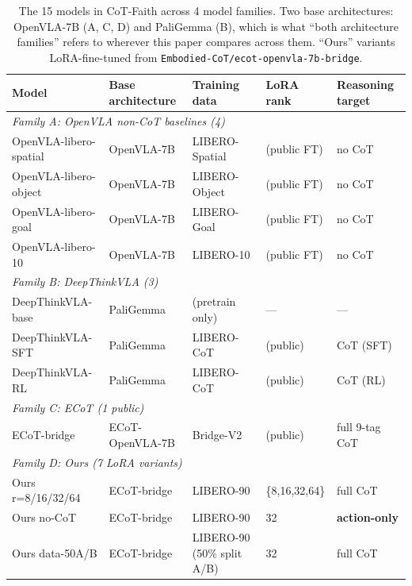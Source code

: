 \documentclass{article}
\begin{document}
\begin{table}[t]
\centering\small
\caption{The 15 models in CoT-Faith across 4 model families. Two base architectures: OpenVLA-7B (A, C, D) and PaliGemma (B), which is what ``both architecture families'' refers to wherever this paper compares across them. ``Ours'' variants LoRA-fine-tuned from \texttt{Embodied-CoT/ecot-openvla-7b-bridge}.}
\label{tab:models}
\begin{tabular}{l l l l l}
\toprule
Model & Base architecture & Training data & LoRA rank & Reasoning target \\
\midrule
\multicolumn{5}{l}{\textit{Family A: OpenVLA non-CoT baselines (4)}} \\
OpenVLA-libero-spatial & OpenVLA-7B     & LIBERO-Spatial & (public FT) & no CoT \\
OpenVLA-libero-object  & OpenVLA-7B     & LIBERO-Object  & (public FT) & no CoT \\
OpenVLA-libero-goal    & OpenVLA-7B     & LIBERO-Goal    & (public FT) & no CoT \\
OpenVLA-libero-10      & OpenVLA-7B     & LIBERO-10      & (public FT) & no CoT \\
\midrule
\multicolumn{5}{l}{\textit{Family B: DeepThinkVLA (3)}} \\
DeepThinkVLA-base      & PaliGemma      & (pretrain only)   & --- & --- \\
DeepThinkVLA-SFT       & PaliGemma      & LIBERO-CoT       & (public) & CoT (SFT) \\
DeepThinkVLA-RL        & PaliGemma      & LIBERO-CoT       & (public) & CoT (RL) \\
\midrule
\multicolumn{5}{l}{\textit{Family C: ECoT (1 public)}} \\
ECoT-bridge            & ECoT-OpenVLA-7B & Bridge-V2       & (public) & full 9-tag CoT \\
\midrule
\multicolumn{5}{l}{\textit{Family D: Ours (7 LoRA variants)}} \\
Ours r=8/16/32/64      & ECoT-bridge & LIBERO-90 & \{8,16,32,64\} & full CoT \\
Ours no-CoT            & ECoT-bridge & LIBERO-90 & 32             & \textbf{action-only} \\
Ours data-50A/B        & ECoT-bridge & LIBERO-90 (50\% split A/B) & 32 & full CoT \\
\bottomrule
\end{tabular}
\end{table}

\end{document}
